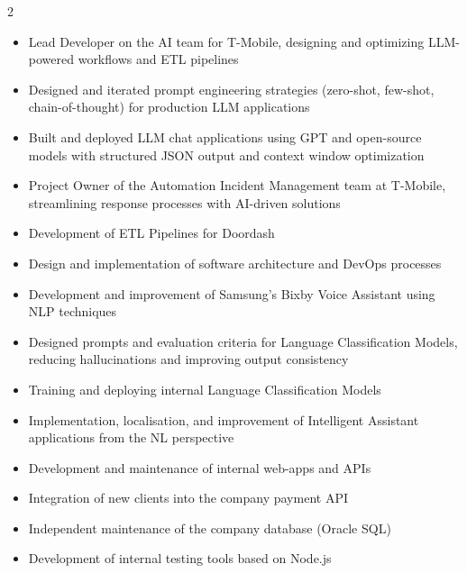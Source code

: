 \documentclass[10pt,a4paper,ragged2e,withhyper]{altacv}
\begin{document}
\begin{paracol}{2}

\begin{itemize}
\item Lead Developer on the AI team for T-Mobile, designing and optimizing LLM-powered workflows and ETL pipelines
\item Designed and iterated prompt engineering strategies (zero-shot, few-shot, chain-of-thought) for production LLM applications
\item Built and deployed LLM chat applications using GPT and open-source models with structured JSON output and context window optimization
\item Project Owner of the Automation Incident Management team at T-Mobile, streamlining response processes with AI-driven solutions
\item Development of ETL Pipelines for Doordash
\item Design and implementation of software architecture and DevOps processes
\end{itemize}

\divider

\begin{itemize}
\item Development and improvement of Samsung's Bixby Voice Assistant using NLP techniques
\item Designed prompts and evaluation criteria for Language Classification Models, reducing hallucinations and improving output consistency
\item Training and deploying internal Language Classification Models
\item Implementation, localisation, and improvement of Intelligent Assistant applications from the NL perspective
\item Development and maintenance of internal web-apps and APIs
\end{itemize}

\divider

\begin{itemize}
\item Integration of new clients into the company payment API
\item Independent maintenance of the company database (Oracle SQL)
\item Development of internal testing tools based on Node.js
\end{itemize}


\end{paracol}
\end{document}
